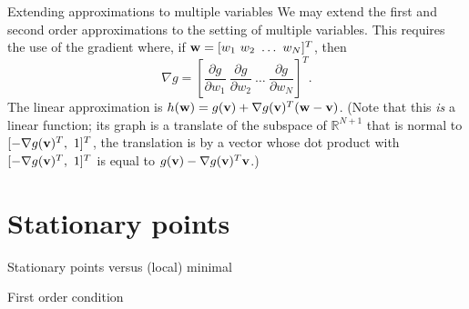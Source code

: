 \documentclass{beamer}
\theoremstyle{example}
\newcommand{\bb}[1]{\mathbb{#1}}
\begin{document}
\begin{frame}{Extending approximations to multiple variables}
    We may extend the first and second order approximations to the setting of multiple variables. This requires the use of the gradient where, if ${\bf w} = [w_1\ w_2\ \ldots\ w_N]^T$, then 
        \[\nabla g = [\frac{\partial g}{\partial w_1}\ \frac{\partial g}{\partial w_2}\ \ldots\ \frac{\partial g}{\partial w_N}]^T.\]
    The linear approximation is $h({\bf w}) = g({\bf v}) + \nabla g({\bf v})^T({\bf w} - {\bf v})$. (Note that this \emph{is} a linear function; its graph is a translate of the subspace of $\bb R^{N+1}$ that is normal to $[-\nabla g({\bf v})^T,\ 1]^T$, the translation is by a vector whose dot product with $[-\nabla g({\bf v})^T,\ 1]^T$ is equal to $g({\bf v}) - \nabla g({\bf v})^T{\bf v}$.)
\end{frame}

\section{Stationary points}

\begin{frame}{Stationary points versus (local) minimal}
\end{frame}

\begin{frame}{First order condition}
\end{frame}
\end{document}
